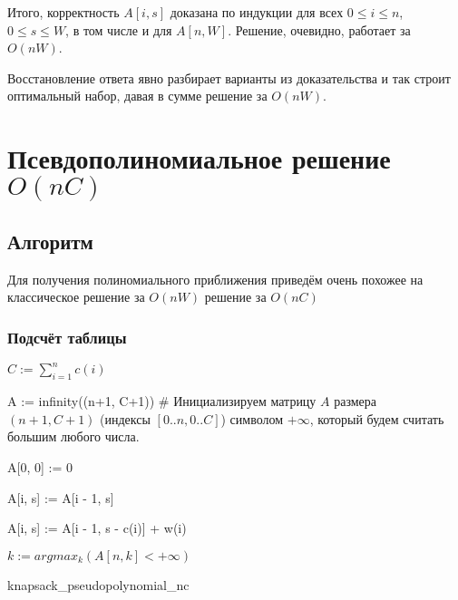 \documentclass{article}
\begin{document}
Итого, корректность $A[i, s]$ доказана по индукции для всех $ 0 \leq i \leq n$, $0 \leq s \leq W$, в том числе и для $A[n, W]$. Решение, очевидно, работает за $O(nW)$.

Восстановление ответа явно разбирает варианты из доказательства и так строит оптимальный набор, давая в сумме решение за $O(nW)$.


\section{Псевдополиномиальное решение $O(nC)$}
\subsection{Алгоритм}

Для получения полиномиального приближения приведём очень похожее на классическое решение за $O(nW)$ решение за $O(nC)$

\subsubsection{Подсчёт таблицы}


\begin{algorithm}[H]
	\SetAlgoLined %
	
	$C := \sum\limits_{i = 1}^{n} {c(i)}$
	
	A := infinity((n+1, C+1)) \# Инициализируем матрицу $A$ размера $(n + 1, C + 1)$ (индексы $[0..n, 0..C]$) символом $+\infty$, который будем считать большим любого числа.
	
	A[0, 0] := 0
	
	 {
		 {
			A[i, s] := A[i - 1, s]
			
			 {
				A[i, s] := A[i - 1, s - c(i)] + w(i)
			}
		}
	}
	
	$k := argmax_{k}(A[n, k] < +\infty)$
	
\caption{knapsack\_pseudopolynomial\_nc}
\end{algorithm}
\end{document}
